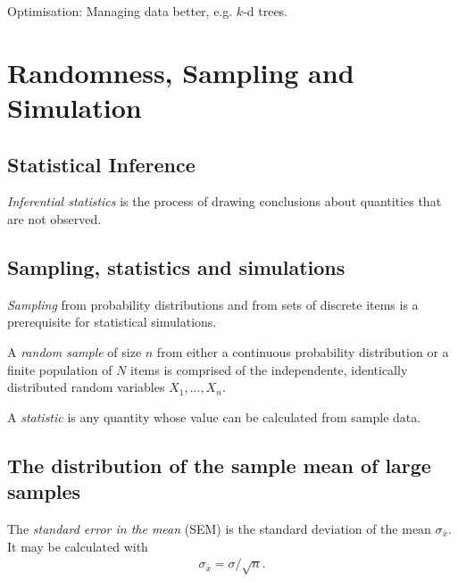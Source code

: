 \documentclass{article}
\begin{document}
Optimisation: Managing data better, e.g. $k$-d trees.


\section{Randomness, Sampling and Simulation}


\subsection{Statistical Inference}

\begin{definition}
	\emph{Inferential statistics} is the process of drawing conclusions
	about quantities that are not observed.
\end{definition}

\subsection{Sampling, statistics and simulations}

\begin{definition}
	\emph{Sampling} from probability distributions and from sets of discrete
	items is a prerequisite for statistical simulations.
\end{definition}

\begin{definition}
	A \emph{random sample} of size $n$ from either a continuous probability
	distribution or a finite population of $N$ items is comprised of
	the independente, identically distributed random variables $X_1,...,X_n$.
\end{definition}

\begin{definition}
	A \emph{statistic} is any quantity whose value can be calculated from
	sample data.
\end{definition}

\subsection{The distribution of the sample mean of large samples}

\begin{definition}
	The \emph{standard error in the mean} (SEM) is the standard deviation
	of the mean $\sigma_{\bar x}$. It may be calculated with
	\begin{align*}
		\sigma_{\bar x} = \sigma / \sqrt{n}.
	\end{align*}
\end{definition}
\end{document}
